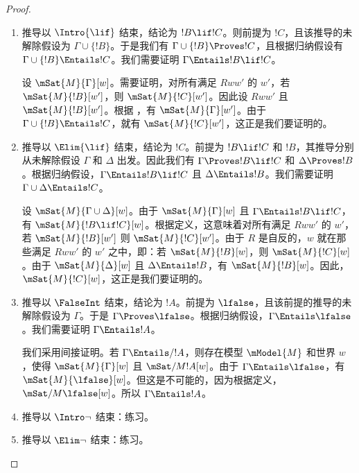 \documentclass[../../../include/open-logic-section]{subfiles}
\begin{document}
\begin{proof}
\begin{enumerate}
{    设 $\mSat{M}{\Gamma \cup \Delta_1 \cup \Delta_2}[w]$。则 $\mSat{M}{\Gamma}[w]$，且由于 $\Gamma \Entails !B \lor !C$，有 $\mSat{M}{!B \lor !C}[w]$。根据 $\mSat{M}{}$ 的定义，要么 $\mSat{M}{!B}[w]$，要么 $\mSat{M}{!C}[w]$。我们分情况讨论：
    (a)~$\mSat{M}{!B}$[w]。则 $\mSat{M}{\Delta_1 \cup \{!B\}}[w]$。
    由于 $\Delta_1 \cup !B \Entails !D$，我们有 $\mSat{M}{!D}[w]$。
    (b)~$\mSat{M}{!C}[w]$。则 $\mSat{M}{\Delta_2 \cup \{!C\}}[w]$。
    由于 $\Delta_2 \cup !C \Entails !D$，我们有 $\mSat{M}{!D}[w]$。所以，无论哪种情况都有 $\mSat{M}{!D}[w]$，这正是我们要证明的。}

  \item 推导以 $\Intro{\lif}$ 结束，结论为 $!B \lif !C$。则前提为 $!C$，且该推导的未解除假设为 $\Gamma \cup \{!B\}$。于是我们有 $\Gamma \cup \{!B\} \Proves !C$，且根据归纳假设有 $\Gamma \cup \{!B\} \Entails !C$。我们需要证明 $\Gamma \Entails !B \lif !C$。

    设 $\mSat{M}{\Gamma}[w]$。需要证明，对所有满足 $Rww'$ 的 $w'$，若 $\mSat{M}{!B}[w']$，则 $\mSat{M}{!C}[w']$。因此设 $Rww'$ 且 $\mSat{M}{!B}[w']$。根据 ，有 $\mSat{M}{\Gamma}[w']$。由于 $\Gamma \cup \{!B\} \Entails !C$，就有 $\mSat{M}{!C}[w']$，这正是我们要证明的。

  \item 推导以 $\Elim{\lif}$ 结束，结论为 $!C$。前提为 $!B \lif !C$ 和 $!B$，其推导分别从未解除假设 $\Gamma$ 和 $\Delta$ 出发。因此我们有 $\Gamma \Proves !B \lif !C$ 和 $\Delta \Proves !B$。根据归纳假设，$\Gamma \Entails !B \lif !C$ 且 $\Delta \Entails !B$。我们需要证明 $\Gamma \cup \Delta \Entails !C$。

    设 $\mSat{M}{\Gamma \cup \Delta}[w]$。由于 $\mSat{M}{\Gamma}[w]$ 且 $\Gamma \Entails !B \lif !C$，有 $\mSat{M}{!B \lif !C}[w]$。根据定义，这意味着对所有满足 $Rww'$ 的 $w'$，若 $\mSat{M}{!B}[w']$ 则 $\mSat{M}{!C}[w']$。由于 $R$ 是自反的，$w$ 就在那些满足 $Rww'$ 的 $w'$ 之中，即：若 $\mSat{M}{!B}[w]$，则 $\mSat{M}{!C}[w]$。由于 $\mSat{M}{\Delta}[w]$ 且 $\Delta \Entails !B$，有 $\mSat{M}{!B}[w]$。因此，$\mSat{M}{!C}[w]$，这正是我们要证明的。

  \item 推导以 $\FalseInt$ 结束，结论为 $!A$。前提为 $\lfalse$，且该前提的推导的未解除假设为 $\Gamma$。于是 $\Gamma \Proves \lfalse$。根据归纳假设，$\Gamma \Entails \lfalse$。我们需要证明 $\Gamma \Entails !A$。

    我们采用间接证明。若 $\Gamma \Entails/ !A$，则存在模型 $\mModel{M}$ 和世界 $w$，使得 $\mSat{M}{\Gamma}[w]$ 且 $\mSat/{M}{!A}[w]$。由于 $\Gamma \Entails \lfalse$，有 $\mSat{M}{\lfalse}[w]$。但这是不可能的，因为根据定义，$\mSat/{M}{\lfalse}[w]$。所以 $\Gamma \Entails !A$。
  \item 推导以 $\Intro\lnot$ 结束：练习。
  \item 推导以 $\Elim\lnot$ 结束：练习。
  \end{enumerate}
\end{proof}
\end{document}
